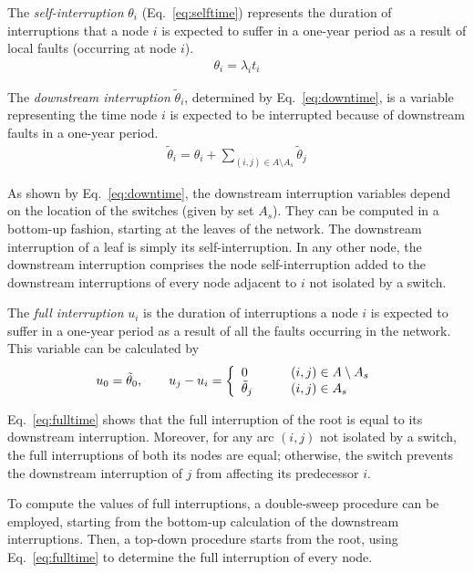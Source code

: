 \documentclass{article}
\begin{document}
The \textit{self-interruption} $\theta_i$ (Eq.~\ref{eq:selftime}) represents the duration of  interruptions that a node $i$ is expected to suffer in a one-year period as a result of local faults (occurring at node $i$). 
	\begin{align} 
		\displaystyle \theta_{i} = \lambda_i t_i \label{eq:selftime} 
	\end{align}


The \textit{downstream interruption} $\tilde{\theta}_{i}$, determined by Eq.~\eqref{eq:downtime},  is a variable representing the time node $i$ is expected to be interrupted because of downstream faults in a one-year period.
	\begin{align}
		\displaystyle \tilde{\theta}_{i} = \theta_{i} + \sum_{(i,j) \in A \setminus A_{s}}{\tilde{\theta}_{j}} \label{eq:downtime}
	\end{align}


As shown by Eq.~\eqref{eq:downtime}, the downstream interruption variables depend on the location of the switches (given by set $A_s$). They can be computed in a bottom-up fashion, starting at the leaves of the network. The downstream interruption of a leaf is simply its self-interruption. In any other node, the downstream interruption comprises the node self-interruption added to the downstream interruptions of every node adjacent to $i$ not isolated by a switch.


The \textit{full interruption} $u_i$ is the duration of interruptions a node $i$ is expected to suffer in a one-year period as a result of all the faults occurring in the network. This variable can be calculated by
\begin{align} 
\displaystyle
u_0 = \tilde{\theta}_{0}, \qquad u_j - u_i =
	\left \{
		\begin{array}{l l}
			0 \qquad & (i,j) \in A \setminus A_{s} \\
			\tilde{\theta}_{j} \qquad & (i,j) \in A_s 
		\end{array}
	\right. \label{eq:fulltime}
\end{align}

Eq.~\eqref{eq:fulltime} shows that the full interruption of the root is equal to its downstream interruption. Moreover, for any arc $(i,j)$ not isolated by a switch, the full interruptions of both its nodes are equal; otherwise, the switch prevents the downstream interruption of $j$ from affecting its predecessor $i$.

To compute the values of full interruptions, a double-sweep procedure can be employed, starting from the bottom-up calculation of the downstream interruptions. Then, a top-down procedure starts from the root, using Eq.~\eqref{eq:fulltime} to determine the full interruption of every node.
\end{document}
